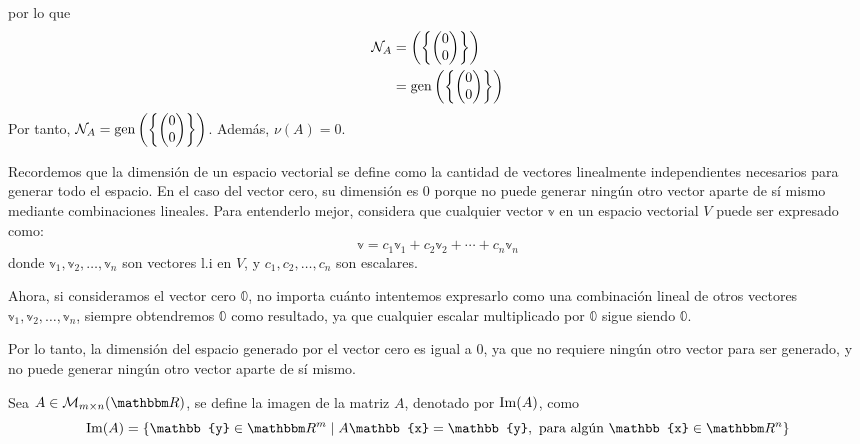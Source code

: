 \begin{example}
    por lo que
    \begin{align*}
        \mathcal{N}_A & = \left( \left\{ \begin{pmatrix}
            0 \\
            0
        \end{pmatrix} \right\} \right) \\
        & = \operatorname{gen} \left( \left\{ \begin{pmatrix}
            0 \\
            0
        \end{pmatrix} \right\} \right)
    \end{align*}
    Por tanto, $\mathcal{N}_A = \operatorname{gen} \left( \left\{ \begin{pmatrix}
        0 \\
        0
    \end{pmatrix} \right\} \right)$.  Además, $\nu(A) = 0$.
\end{example}

\begin{remark}
    Recordemos que la dimensión de un espacio vectorial se define como la cantidad de vectores linealmente independientes necesarios para generar todo el espacio. En el caso del vector cero, su dimensión es $0$ porque no puede generar ningún otro vector aparte de sí mismo mediante combinaciones lineales. Para entenderlo mejor, considera que cualquier vector $\mathbb{v}$ en un espacio vectorial $V$ puede ser expresado como:
    $$\mathbb{v} = c_1 \mathbb{v}_1 + c_2 \mathbb{v}_2 + \cdots + c_n \mathbb{v}_n$$
    donde $\mathbb{v}_1, \mathbb{v}_2, \dots, \mathbb{v}_n$ son vectores l.i en $V$, y $c_1, c_2, \dots, c_n$ son escalares.
    
    Ahora, si consideramos el vector cero $\mathbb{0}$, no importa cuánto intentemos expresarlo como una combinación lineal de otros vectores $\mathbb{v}_1, \mathbb{v}_2, \dots, \mathbb{v}_n$, siempre obtendremos $\mathbb{0}$ como resultado, ya que cualquier escalar multiplicado por $\mathbb{0}$ sigue siendo $\mathbb{0}$.
    
    Por lo tanto, la dimensión del espacio generado por el vector cero es igual a $0$, ya que no requiere ningún otro vector para ser generado, y no puede generar ningún otro vector aparte de sí mismo.
\end{remark}

\begin{definition}
    Sea $A \in \matrizmn$, se define la imagen de la matriz $A$, denotado por $\operatorname{Im}(A)$, como
    $$\Ima(A) = \left\{ \mathbb{y} \in \RR[m] \mid A\mathbb{x} = \mathbb{y}, \text{ para algún } \mathbb{x} \in \RR[n] \right\}$$
\end{definition}

